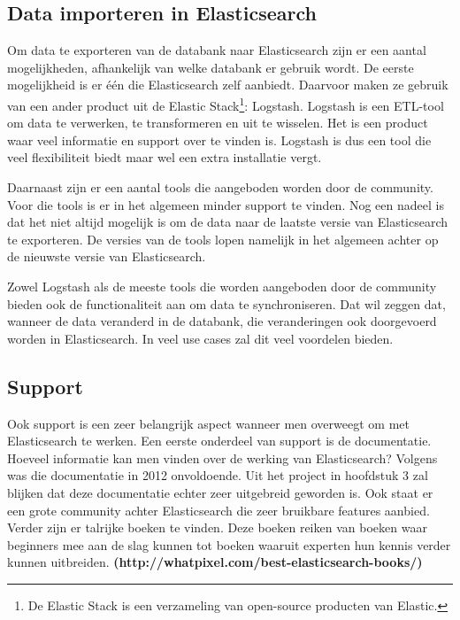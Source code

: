 \subsection{Data importeren in Elasticsearch}

Om data te exporteren van de databank naar Elasticsearch zijn er een aantal mogelijkheden, afhankelijk van welke databank er gebruik wordt. De eerste mogelijkheid is er één die Elasticsearch zelf aanbiedt. Daarvoor maken ze gebruik van een ander product uit de Elastic Stack\footnote{De Elastic Stack is een verzameling van open-source producten van Elastic.}: Logstash. Logstash is een ETL-tool om data te verwerken, te transformeren en uit te wisselen. Het is een product waar veel informatie en support over te vinden is. Logstash is dus een tool die veel flexibiliteit biedt maar wel een extra installatie vergt. 

Daarnaast zijn er een aantal tools die aangeboden worden door de community. Voor die tools is er in het algemeen minder support te vinden. Nog een nadeel is dat het niet altijd mogelijk is om de data naar de laatste versie van Elasticsearch te exporteren. De versies van de tools lopen namelijk in het algemeen achter op de nieuwste versie van Elasticsearch. 

Zowel Logstash als de meeste tools die worden aangeboden door de community bieden ook de functionaliteit aan om data te synchroniseren. Dat wil zeggen dat, wanneer de data veranderd in de databank, die veranderingen ook doorgevoerd worden in Elasticsearch. In veel use cases zal dit veel voordelen bieden. 

\subsection{Support}

Ook support is een zeer belangrijk aspect wanneer men overweegt om met Elasticsearch te werken. Een eerste onderdeel van support is de documentatie. Hoeveel informatie kan men vinden over de werking van Elasticsearch? Volgens \textcite{Glauner2012} was die documentatie in 2012 onvoldoende. Uit het project in hoofdstuk 3 zal blijken dat deze documentatie echter zeer uitgebreid geworden is. Ook staat er een grote community achter Elasticsearch die zeer bruikbare features aanbied. Verder zijn er talrijke boeken te vinden. Deze boeken reiken van boeken waar beginners mee aan de slag kunnen tot boeken waaruit experten hun kennis verder kunnen uitbreiden. \textbf{(http://whatpixel.com/best-elasticsearch-books/)}

